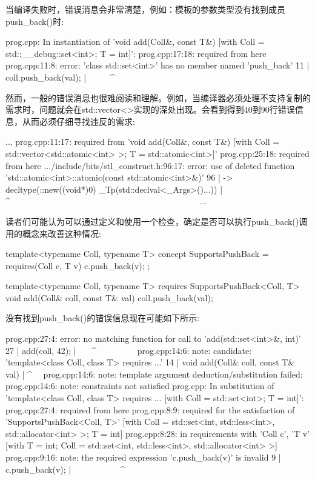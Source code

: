 当编译失败时，错误消息会非常清楚，例如：模板的参数类型没有找到成员push\_back()时:

{\footnotesize
\begin{shell}
prog.cpp: In instantiation of ’void add(Coll&, const T&)
             [with Coll = std::__debug::set<int>; T = int]’:
prog.cpp:17:18:     required from here
prog.cpp:11:8: error: ’class std::set<int>’ has no member named ’push_back’
  11 | coll.push_back(val);
      | ~~~~~^~~~~~~~~
\end{shell}
}

然而，一般的错误消息也很难阅读和理解。例如，当编译器必须处理不支持复制的需求时，问题就会在std::vector<>实现的深处出现。会看到得到40到90行错误信息，从而必须仔细寻找违反的需求:

{\footnotesize
\begin{shell}
...
prog.cpp:11:17: required from ’void add(Coll&, const T&)
                    [with Coll = std::vector<std::atomic<int> >; T = std::atomic<int>]’
prog.cpp:25:18:     required from here
.../include/bits/stl_construct.h:96:17:
    error: use of deleted function
’std::atomic<int>::atomic(const std::atomic<int>&)’
    96 | -> decltype(::new((void*)0) _Tp(std::declval<_Args>()...))
        |                  ^~~~~~~~~~~~~~~~~~~~~~~~~~~~~~~~~~~~~~~~~~~~~
...
\end{shell}
}

读者们可能认为可以通过定义和使用一个检查，确定是否可以执行push\_back()调用的概念来改善这种情况:

\begin{cpp}
template<typename Coll, typename T>
concept SupportsPushBack = requires(Coll c, T v) {
	c.push_back(v);
};

template<typename Coll, typename T>
requires SupportsPushBack<Coll, T>
void add(Coll& coll, const T& val)
{
	coll.push_back(val);
}
\end{cpp}

没有找到push\_back()的错误信息现在可能如下所示:

{\scriptsize
\begin{shell}
prog.cpp:27:4: error: no matching function for call to ’add(std::set<int>&, int)’
    27 | add(coll, 42);
        | ~~~^~~~~~~~~~
prog.cpp:14:6: note: candidate: ’template<class Coll, class T> requires ...’
     14 | void add(Coll& coll, const T& val)
         |      ^~~
prog.cpp:14:6: note: template argument deduction/substitution failed:
prog.cpp:14:6: note: constraints not satisfied
prog.cpp: In substitution of ’template<class Coll, class T> requires ...
           [with Coll = std::set<int>; T = int]’:
prog.cpp:27:4: required from here
prog.cpp:8:9: required for the satisfaction of ’SupportsPushBack<Coll, T>’
                  [with Coll = std::set<int, std::less<int>, std::allocator<int> >; T = int]
prog.cpp:8:28: in requirements with ’Coll c’, ’T v’
                      [with T = int; Coll = std::set<int, std::less<int>, std::allocator<int> >]
prog.cpp:9:16: note: the required expression ’c.push_back(v)’ is invalid
      9 | c.push_back(v);
         | ~~~~~~~~~~~^~~
\end{shell}
}

